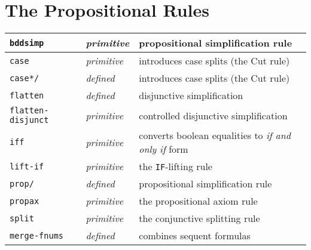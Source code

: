\documentclass[12pt,twoside]{book}
\makeatletter
\newcommand{\indtt}[1]{\texttt{#1}\index{#1@{\texttt{#1}}}}  %
\newcommand{\indttdol}[1]{\texttt{#1/\char36}\index{#1@{\texttt{#1}}}} %
\makeatother
\begin{document}
\section{The Propositional Rules}

\begin{tabular}{|l|l|l|}\hline
\indtt{bddsimp} & \emph{primitive} & propositional simplification rule\\\hline
\indtt{case} & \emph{primitive} & introduces case splits (the Cut
rule)\\\hline
\indttdol{case*} & \emph{defined} & introduces case splits (the Cut rule)\\\hline
\indtt{flatten} & \emph{defined} & disjunctive simplification\\\hline
\indtt{flatten-disjunct} & \emph{primitive} & controlled disjunctive simplification\\\hline
\indtt{iff} & \emph{primitive} & converts boolean equalities to \emph{if and only if} form\\\hline
\indtt{lift-if} & \emph{primitive} & the \texttt{IF}-lifting rule \\\hline
\indttdol{prop} & \emph{defined} & propositional simplification rule \\\hline
\indtt{propax} & \emph{primitive} & the propositional axiom rule\\\hline
\indtt{split} & \emph{primitive} & the conjunctive splitting rule\\\hline
\indtt{merge-fnums} & \emph{defined} & combines sequent formulas\\\hline
\end{tabular}
\end{document}
